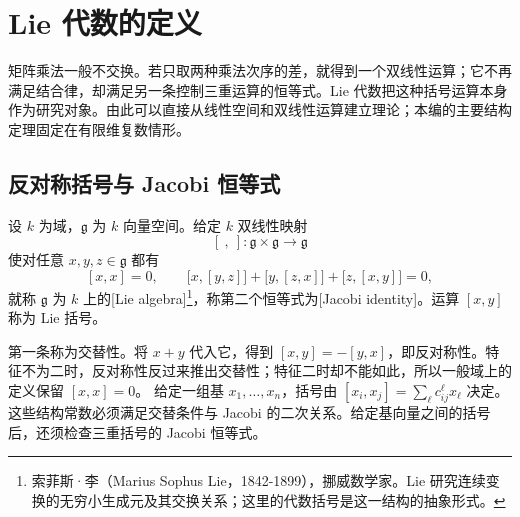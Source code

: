 
\section{Lie 代数的定义}
\label{b5:sec:1101}


%
%

矩阵乘法一般不交换。若只取两种乘法次序的差，就得到一个双线性运算；它不再满足结合律，却满足另一条控制三重运算的恒等式。Lie 代数把这种括号运算本身作为研究对象。由此可以直接从线性空间和双线性运算建立理论；本编的主要结构定理固定在有限维复数情形。

\subsection{反对称括号与 Jacobi 恒等式}
\label{b5:subsec:1101:01}

\begin{definition}\label{b5:def:lie-algebra}
	设 \(k\) 为域，\(\mathfrak g\) 为 \(k\) 向量空间。给定 \(k\) 双线性映射
	\[
		[\ ,\ ]:\mathfrak g\times\mathfrak g\longrightarrow\mathfrak g
	\]
	使对任意 \(x,y,z\in\mathfrak g\) 都有
	\[
		[x,x]=0,\qquad \bigl[x,[y,z]\bigr]+\bigl[y,[z,x]\bigr]+\bigl[z,[x,y]\bigr]=0,
	\]
	就称 \(\mathfrak g\) 为 \(k\) 上的[Lie algebra]\footnote{索菲斯·李（Marius Sophus Lie，1842-1899），挪威数学家。Lie 研究连续变换的无穷小生成元及其交换关系；这里的代数括号是这一结构的抽象形式。}，称第二个恒等式为[Jacobi identity]。运算 \([x,y]\) 称为 Lie 括号。
\end{definition}
第一条称为交替性。将 \(x+y\) 代入它，得到 \([x,y]=-[y,x]\)，即反对称性。特征不为二时，反对称性反过来推出交替性；特征二时却不能如此，所以一般域上的定义保留 \([x,x]=0\)。
\ProseParagraphBreak
给定一组基 \(x_1,\ldots,x_n\)，括号由 \([x_i,x_j]=\sum_\ell c_{ij}^{\ell}x_\ell\) 决定。这些结构常数必须满足交替条件与 Jacobi 的二次关系。给定基向量之间的括号后，还须检查三重括号的 Jacobi 恒等式。

\ProseParagraphBreak

